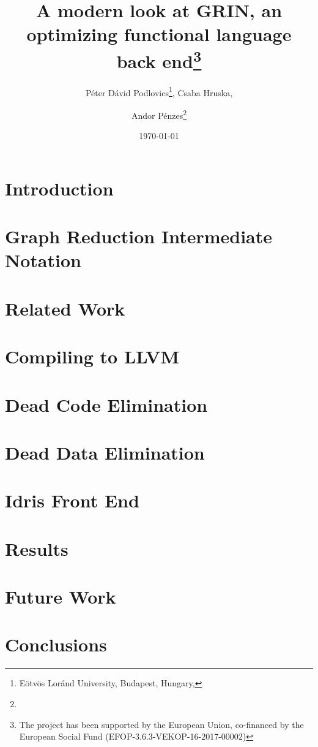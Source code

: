 \documentclass{actacyb}
\begin{document}
	
	\title{A modern look at GRIN, an optimizing functional language back end\thanks{ The project has been supported by the European Union, co-financed by the European Social Fund (EFOP-3.6.3-VEKOP-16-2017-00002)}}

	\date{\today}
	\author
	{
		Péter Dávid Podlovics\thanks{Eötvös Loránd University, Budapest, Hungary, }, 
		Csaba Hruska, \and 
		Andor Pénzes\thanks{}
	}
	
	\maketitle
	
	
	\section{Introduction} \label{sec:intro}
	
	
	\section{Graph Reduction Intermediate Notation}
	
	
	\section{Related Work}
	
	
	\section{Compiling to LLVM}
	
	
	\section{Dead Code Elimination}
	
	
	\section{Dead Data Elimination} \label{sec:dde}
	
	
	\section{Idris Front End} \label{sec:idris-front-end}
	
	
	\section{Results}
	
	
	\section{Future Work} \label{sec:future-work}
	
	
	\section{Conclusions}
	
		
	\newpage
	

	
\end{document}
